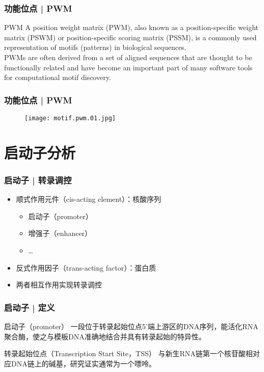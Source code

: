 \begin{frame}
  \frametitle{功能位点 | PWM}
  \begin{block}{PWM}
A position weight matrix (PWM), also known as a position-specific weight matrix (PSWM) or position-specific scoring matrix (PSSM), is a commonly used representation of motifs (patterns) in biological sequences.\\
\vspace{0.5em}
PWMs are often derived from a set of aligned sequences that are thought to be functionally related and have become an important part of many software tools for computational motif discovery.
  \end{block}
\end{frame}

\begin{frame}
  \frametitle{功能位点 | PWM}
  \begin{figure}
    \centering
    \texttt{[image: motif.pwm.01.jpg]}
  \end{figure}
\end{frame}

\section{启动子分析}
\begin{frame}
  \frametitle{启动子 | 转录调控}
  \begin{itemize}
    \item 顺式作用元件（cis-acting element）：核酸序列
      \begin{itemize}
        \item 启动子（promoter）
        \item 增强子（enhancer）
        \item \ldots
      \end{itemize}
    \item 反式作用因子（trans-acting factor）：蛋白质
    \item 两者相互作用实现转录调控
  \end{itemize}
\end{frame}

\begin{frame}
  \frametitle{启动子 | 定义}
  \begin{block}{启动子（promoter）}
    一段位于转录起始位点5'端上游区的DNA序列，能活化RNA聚合酶，使之与模板DNA准确地结合并具有转录起始的特异性。
  \end{block}
  \pause
  \begin{block}{转录起始位点（Transcription Start Site，TSS）}
    与新生RNA链第一个核苷酸相对应DNA链上的碱基，研究证实通常为一个嘌呤。
  \end{block}
\end{frame}

